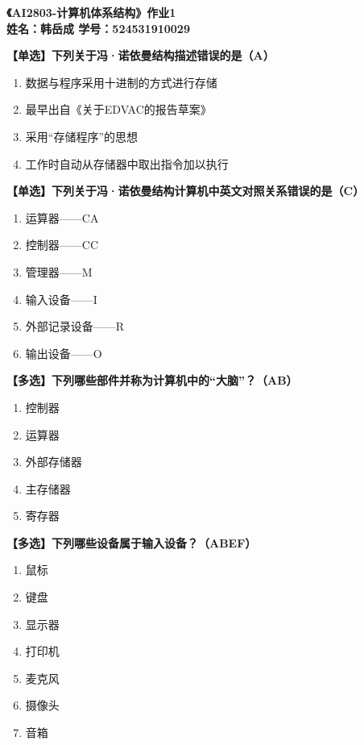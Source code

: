 \documentclass[12pt, a4paper]{ctexart}
\begin{document}
\begin{center}
    \LARGE \textbf{《AI2803-计算机体系结构》作业1}
    \\
    \large \textbf{姓名：韩岳成 \quad 学号：524531910029}
\end{center}
\vspace{0.5cm}

\textbf{【单选】下列关于冯·诺依曼结构描述错误的是（A）}
\begin{enumerate}[label=\Alph*., itemsep=2pt, parsep=0pt]
    \item 数据与程序采用十进制的方式进行存储 
    \item 最早出自《关于EDVAC的报告草案》 
    \item 采用“存储程序”的思想 
    \item 工作时自动从存储器中取出指令加以执行
\end{enumerate}
\vspace{0.4cm}

\textbf{【单选】下列关于冯·诺依曼结构计算机中英文对照关系错误的是（C）}
\begin{enumerate}[label=\Alph*., itemsep=2pt, parsep=0pt]
    \item 运算器——CA 
    \item 控制器——CC 
    \item 管理器——M 
    \item 输入设备——I 
    \item 外部记录设备——R 
    \item 输出设备——O
\end{enumerate}
\vspace{0.4cm}

\textbf{【多选】下列哪些部件并称为计算机中的“大脑”？（AB）}
\begin{enumerate}[label=\Alph*., itemsep=2pt, parsep=0pt]
    \item 控制器 
    \item 运算器 
    \item 外部存储器 
    \item 主存储器 
    \item 寄存器
\end{enumerate}
\vspace{0.4cm}

\textbf{【多选】下列哪些设备属于输入设备？（ABEF）}
\begin{enumerate}[label=\Alph*., itemsep=2pt, parsep=0pt]
    \item 鼠标 
    \item 键盘 
    \item 显示器 
    \item 打印机
    \item 麦克风 
    \item 摄像头 
    \item 音箱
\end{enumerate}
\vspace{0.4cm}
\end{document}
